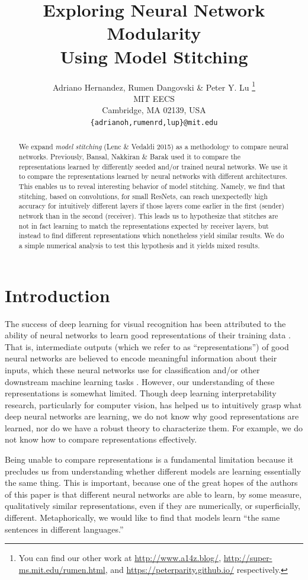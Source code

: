 \documentclass{article} %
\title{Exploring Neural Network Modularity \\ Using Model Stitching}
\author{Adriano Hernandez, Rumen Dangovski \& Peter Y. Lu \thanks{You can find our other work at \url{http://www.a14z.blog/}, \url{http://super-ms.mit.edu/rumen.html}, and \url{https://peterparity.github.io/} respectively.} \\
MIT EECS\\
Cambridge, MA 02139, USA \\
\texttt{\{adrianoh,rumenrd,lup\}@mit.edu}
}
\begin{document}
\maketitle

\begin{abstract}
We expand \textit{model stitching} (Lenc \& Vedaldi 2015) as a methodology to compare neural networks.
Previously, Bansal, Nakkiran \& Barak used it to compare the representations learned by differently seeded
and/or trained neural networks.
We use it to compare the representations learned by neural networks with different architectures.
This enables us to reveal interesting behavior of model stitching. Namely, we find that stitching, 
based on convolutions, for small ResNets, can reach unexpectedly
high accuracy for intuitively different layers if those layers come earlier in the first (sender) network than in
the second (receiver). This leads us to hypothesize that stitches are not in fact learning to match the
representations expected by receiver layers, but instead to find different representations which nonetheless
yield similar results.
We do a simple numerical analysis to test this hypothesis and it yields mixed results.
\end{abstract}

\section{Introduction}
\label{Introduction}
The success of deep learning for visual recognition has been attributed to the ability of neural networks to learn
good representations of their training data \cite{Rumelhart1986LearningIR}. That is, intermediate outputs (which we refer
to as ``representations'') of good neural networks 
are believed to encode meaningful information about their inputs, which these neural networks use for classification and/or other
downstream machine learning tasks \cite{goodfellow2016deep}.
However, our understanding of these representations is somewhat limited. Though
deep learning interpretability research, particularly for computer vision, has helped us
to intuitively grasp what deep neural 
networks are learning, we do not
know why good representations are learned, nor do we have a robust theory to characterize them. For example, we do not
know how to compare representations effectively.

Being unable to compare representations is a fundamental limitation because it precludes us from understanding whether
different models are learning essentially the same thing. This is important, because one of the great hopes of the authors
of this paper is that
different neural networks are able to learn, by some measure, qualitatively similar representations, even if they are
numerically, or superficially, different. Metaphorically,
we would like to find that models learn ``the same sentences in different languages.''
\end{document}

